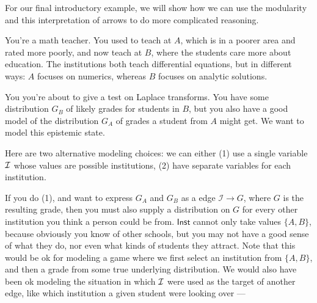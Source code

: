 \documentclass{article}
\newcommand{\Ed}{\mathcal E}
\numberwithin{equation}{section}
\begin{document}
	
	\begin{vfull}
	For our final introductory example, we will show how we can use the modularity and this interpretation of arrows to do more complicated reasoning.

	\begin{example} \label{ex:teacher}
		You're a math teacher. You used to teach at $A$, which is in a poorer area and rated more poorly, and now teach at $B$, where the students care more about education. The institutions both teach differential equations, but in different ways: $A$ focuses on numerics, whereas $B$ focuses on analytic solutions.
		
		You you're about to give a test on Laplace transforms.
		You have some distribution $G_B$ of likely grades for students in $B$, but you also have a good model of the distribution $G_A$ of grades a student from $A$ might get. We want to model this epistemic state.

		Here are two alternative modeling choices: we can either (1) use a single variable $\cal I$ whose values are possible institutions, (2) have separate variables for each institution.
		
		\begin{center}
		\end{center}
		
		If you do (1), and want to express $G_A$ and $G_B$ as a edge $\mathcal  I \to G$, where $G$ is the resulting grade, then you must also supply a distribution on $G$ for every other institution you think a person could be from. $\mathsf {Inst}$ cannot only take values $\{A,B\} $, because obviously you know of other schools, but you may not have a good sense of what they do, nor even what kinds of students they attract. 
			Note that this would be ok for modeling a game where we first select an institution from $\{A, B\}$, and then a grade from some true underlying distribution. We would also have been ok modeling the situation in which $\cal I$ were used as the target of another edge, like which institution a given student were looking over --- 
		

\end{example}
\end{vfull}
\end{document}
